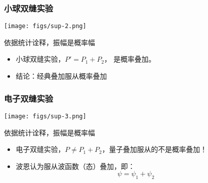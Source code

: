  \begin{frame}
     \frametitle{小球双缝实验}
     \begin{center}
         \texttt{[image: figs/sup-2.png]} \\
     \end{center} 
     依据统计诠释，振幅是概率幅\\
     \begin{itemize}
          \item 小球双缝实验，$P'=P_1+P_2 $， 是概率叠加。
          \item 结论：经典叠加服从概率叠加
     \end{itemize}
 \end{frame} 
 
 
 \begin{frame}
     \frametitle{电子双缝实验}
     \begin{center}
         \texttt{[image: figs/sup-3.png]} \\
     \end{center} 
     依据统计诠释，振幅是概率幅\\
     \begin{itemize}
          \item 电子双缝实验，$P\neq P_1+P_2 $，量子叠加服从的不是概率叠加！
          \item 波恩认为服从波函数（态）叠加，即：
         $$ \psi =\psi_1+\psi_2$$
     \end{itemize}
 \end{frame} 
 
